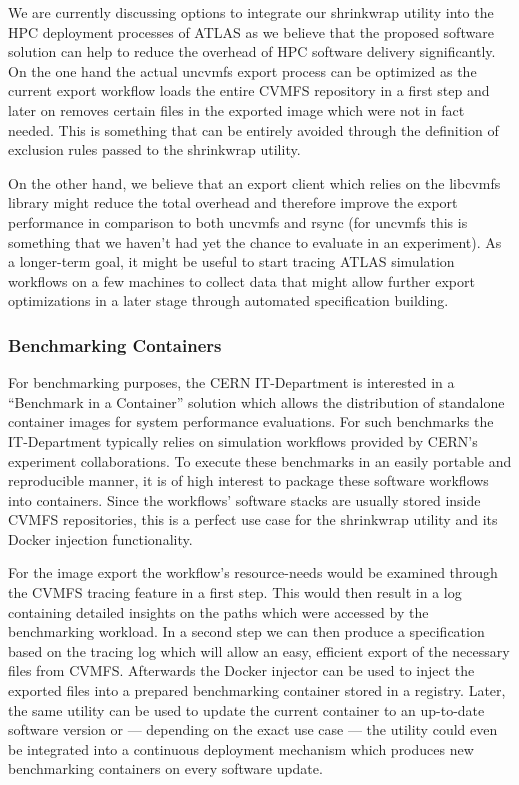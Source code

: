 \documentclass[sigconf]{acmart}
\begin{document}
We are currently discussing options to integrate our shrinkwrap utility into the HPC deployment processes of ATLAS as we believe that the proposed software solution can help to reduce the overhead of HPC software delivery significantly. On the one hand the actual uncvmfs export process can be optimized as the current export workflow loads the entire CVMFS repository in a first step and later on removes certain files in the exported image which were not in fact needed. This is something that can be entirely avoided through the definition of exclusion rules passed to the shrinkwrap utility.

On the other hand, we believe that an export client which relies on the libcvmfs library might reduce the total overhead and therefore improve the export performance in comparison to both uncvmfs and rsync (for uncvmfs this is something that we haven’t had yet the chance to evaluate in an experiment).
As a longer-term goal, it might be useful to start tracing ATLAS simulation workflows on a few machines to collect data that might allow further export optimizations in a later stage through automated specification building.

\subsubsection{Benchmarking Containers}
For benchmarking purposes, the CERN IT-Department is interested in a ``Benchmark in a Container'' solution which allows the distribution of standalone container images for system performance evaluations. For such benchmarks the IT-Department typically relies on simulation workflows provided by CERN's experiment collaborations. To execute these benchmarks in an easily portable and reproducible manner, it is of high interest to package these software workflows into containers. Since the workflows' software stacks are usually stored inside CVMFS repositories, this is a perfect use case for the shrinkwrap utility and its Docker injection functionality.

For the image export the workflow’s resource-needs would be examined through the CVMFS tracing feature in a first step. This would then result in a log containing detailed insights on the paths which were accessed by the benchmarking workload. In a second step we can then produce a specification based on the tracing log which will allow an easy, efficient export of the necessary files from CVMFS. Afterwards the Docker injector can be used to inject the exported files into a prepared benchmarking container stored in a registry. Later, the same utility can be used to update the current container to an up-to-date software version or — depending on the exact use case — the utility could even be integrated into a continuous deployment mechanism which produces new benchmarking containers on every software update.
\end{document}

